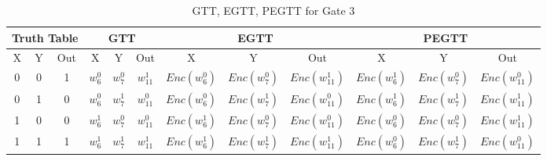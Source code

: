 \documentclass[times]{article}
\begin{document}
	\begin{table}
		\centering
		\caption{GTT, EGTT, PEGTT for Gate 3}
		\label{tab:gtt3}
		\begin{adjustbox}{width=1\textwidth}
		\begin{tabular}{|c|c|c||c|c|c||c|c|c||c|c|c|}
			\hline
			\multicolumn{3}{|c||}{Truth Table} 		& 
				\multicolumn{3}{|c||}{GTT}			& 
					\multicolumn{3}{|c||}{EGTT} 		& 
						\multicolumn{3}{|c|}{PEGTT} \\
			\hline
			\hline
			X & Y & Out	& 
				X & Y & Out	& 
					X & Y & Out	& 
						X & Y & Out	\\
			\hline
			0 & 0 & 1 	&
				$w_{6}^0$	& $w_{7}^0$	& $w_{11}^1$	& 
					$Enc(w_{6}^0)$	& $Enc(w_{7}^0)$	& $Enc(w_{11}^1)$ &
						$Enc(w_{6}^1)$	& $Enc(w_{7}^0)$	& $Enc(w_{11}^0)$ \\
			\hline
			0 & 1 & 0 	&
				$w_{6}^0$	& $w_{7}^1$	& $w_{11}^0$	& 
					$Enc(w_{6}^0)$	& $Enc(w_{7}^1)$	& $Enc(w_{11}^0)$ &
						$Enc(w_{6}^1)$	& $Enc(w_{7}^1)$	& $Enc(w_{11}^1)$ \\
			\hline
			1 & 0 & 0 	&
				$w_{6}^1$	& $w_{7}^0$	& $w_{11}^0$	& 
					$Enc(w_{6}^1)$	& $Enc(w_{7}^0)$	& $Enc(w_{11}^0)$ &
						$Enc(w_{6}^0)$	& $Enc(w_{7}^0)$	& $Enc(w_{11}^1)$ \\
			\hline
			1 & 1 & 1 	&
				$w_{6}^1$	& $w_{7}^1$	& $w_{11}^1$	& 
					$Enc(w_{6}^1)$	& $Enc(w_{7}^1)$	& $Enc(w_{11}^1)$ &
						$Enc(w_{6}^0)$	& $Enc(w_{7}^1)$	& $Enc(w_{11}^0)$ \\
			\hline
		\end{tabular}
		\end{adjustbox}
	\end{table}
\end{document}
